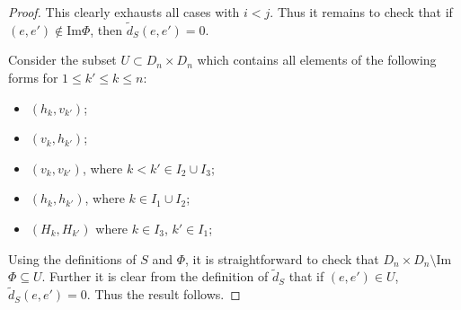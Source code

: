\documentclass{amsart}
\begin{document}
\begin{proof}
    This clearly exhausts all cases with $i<j$. 
    Thus it remains to check that if $(e,e')\not\in$Im$\Phi$, then $\widetilde{d}_S(e,e')=0$.

    Consider the subset $U\subset D_n\times D_n$ which contains all elements of the following forms for $1\leq k'\leq k\leq n$:
    \begin{itemize}
      \item $(h_k, v_{k'})$;
      \item $(v_k, h_{k'})$;
      \item $(v_k, v_{k'})$, where $k<k'\in I_2\cup I_3$;
      \item $(h_k, h_{k'})$, where $k\in I_1\cup I_2$;
      \item $(H_k, H_{k'})$ where $k\in I_3$, $k'\in I_1$;
    \end{itemize}
    Using the definitions of $S$ and $\Phi$, it is straightforward to check that $D_n\times D_n\setminus $Im$\Phi\subseteq U$.
    Further it is clear from the definition of $\widetilde{d}_S$ that if $(e,e')\in U$, $\widetilde{d}_S(e,e')=0$.
    Thus the result follows.
  \end{proof}
\end{document}
